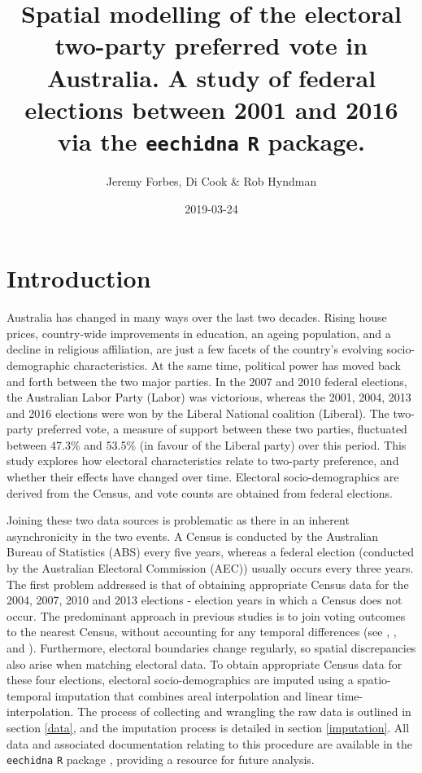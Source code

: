 \documentclass[openany]{book}
\title{Spatial modelling of the electoral two-party preferred vote in Australia. A study of federal elections between 2001 and 2016 via the \texttt{eechidna} \texttt{R} package.}
\author{Jeremy Forbes, Di Cook \& Rob Hyndman}
\date{2019-03-24}
\begin{document}
\maketitle

{
\setcounter{tocdepth}{1}
\tableofcontents
}
\hypertarget{intro}{%
\chapter{Introduction}\label{intro}}

Australia has changed in many ways over the last two decades. Rising house prices, country-wide improvements in education, an ageing population, and a decline in religious affiliation, are just a few facets of the country's evolving socio-demographic characteristics. At the same time, political power has moved back and forth between the two major parties. In the 2007 and 2010 federal elections, the Australian Labor Party (Labor) was victorious, whereas the 2001, 2004, 2013 and 2016 elections were won by the Liberal National coalition (Liberal). The two-party preferred vote, a measure of support between these two parties, fluctuated between 47.3\% and 53.5\% (in favour of the Liberal party) over this period. This study explores how electoral characteristics relate to two-party preference, and whether their effects have changed over time. Electoral socio-demographics are derived from the Census, and vote counts are obtained from federal elections.

Joining these two data sources is problematic as there in an inherent asynchronicity in the two events. A Census is conducted by the Australian Bureau of Statistics (ABS) every five years, whereas a federal election (conducted by the Australian Electoral Commission (AEC)) usually occurs every three years. The first problem addressed is that of obtaining appropriate Census data for the 2004, 2007, 2010 and 2013 elections - election years in which a Census does not occur. The predominant approach in previous studies is to join voting outcomes to the nearest Census, without accounting for any temporal differences (see \citet{DavisStimson98}, \citet{Stimson06}, \citet{Liao09} and \citet{Stimson09}). Furthermore, electoral boundaries change regularly, so spatial discrepancies also arise when matching electoral data. To obtain appropriate Census data for these four elections, electoral socio-demographics are imputed using a spatio-temporal imputation that combines areal interpolation \citep{Goodchild1993} and linear time-interpolation. The process of collecting and wrangling the raw data is outlined in section \ref{data}, and the imputation process is detailed in section \ref{imputation}. All data and associated documentation relating to this procedure are available in the \texttt{eechidna} \texttt{R} package \citep{eechidna}, providing a resource for future analysis.
\end{document}
